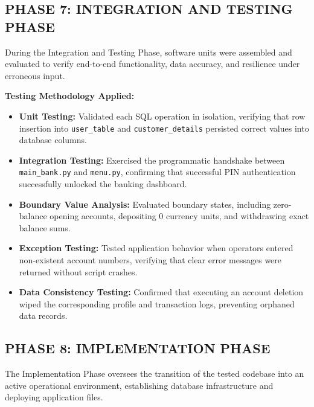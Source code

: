 \documentclass[12pt,a4paper]{article}
\begin{document}
\clearpage

\subsection*{PHASE 7: INTEGRATION AND TESTING PHASE}
During the Integration and Testing Phase, software units were assembled and evaluated to verify end-to-end functionality, data accuracy, and resilience under erroneous input.

\vspace{0.6em}
\noindent\textbf{Testing Methodology Applied:}
\begin{itemize}
    \item \textbf{Unit Testing:} Validated each SQL operation in isolation, verifying that row insertion into \texttt{user\_table} and \texttt{customer\_details} persisted correct values into database columns.
    \item \textbf{Integration Testing:} Exercised the programmatic handshake between \texttt{main\_bank.py} and \texttt{menu.py}, confirming that successful PIN authentication successfully unlocked the banking dashboard.
    \item \textbf{Boundary Value Analysis:} Evaluated boundary states, including zero-balance opening accounts, depositing 0 currency units, and withdrawing exact balance sums.
    \item \textbf{Exception Testing:} Tested application behavior when operators entered non-existent account numbers, verifying that clear error messages were returned without script crashes.
    \item \textbf{Data Consistency Testing:} Confirmed that executing an account deletion wiped the corresponding profile and transaction logs, preventing orphaned data records.
\end{itemize}

\clearpage

\subsection*{PHASE 8: IMPLEMENTATION PHASE}
The Implementation Phase oversees the transition of the tested codebase into an active operational environment, establishing database infrastructure and deploying application files.
\end{document}
